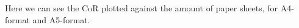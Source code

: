 \documentclass[preview]{standalone}
\begin{document}
\begin{center}
Here we can see the CoR plotted against the amount of paper sheets, for A4-format and A5-format.
\end{center}
\end{document}
